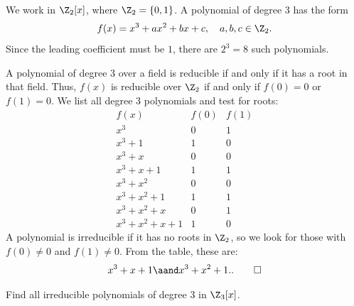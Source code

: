 \begin{solution}
  We work in $\Z_2[x]$, where $\Z_2 = \{0,1\}$. A polynomial of degree $3$ has the form
  \[%
    f(x) = x^3 + ax^2 + bx + c, \quad a,b,c \in \Z_2
  .\]%
  Since the leading coefficient must be $1$, there are $2^3 = 8$ such polynomials.

  A polynomial of degree $3$ over a field is reducible if and only if it has a root in that field. Thus, $f(x)$ is reducible over $\Z_2$ if and only if $f(0) = 0$ or $f(1) = 0$. We list all degree $3$ polynomials and test for roots:
  \[%
    \begin{array}{c|c|c}
      f(x) & f(0) & f(1) \\ \hline
      x^3 & 0 & 1 \\
      x^3+1 & 1 & 0 \\
      x^3+x & 0 & 0 \\
      x^3+x+1 & 1 & 1 \\
      x^3+x^2 & 0 & 0 \\
      x^3+x^2+1 & 1 & 1 \\
      x^3+x^2+x & 0 & 1 \\
      x^3+x^2+x+1 & 1 & 0
    \end{array}
  \]
  A polynomial is irreducible if it has no roots in $\Z_2$, so we look for those with $f(0) \neq 0$ and $f(1) \neq 0$. From the table, these are:
  \[%
    x^3 + x + 1 \aand x^3 + x^2 + 1.
  .\qedhere\]%
\end{solution}

\begin{problem}[28.39]
  Find all irreducible polynomials of degree 3 in $\Z_3[x]$.
\end{problem}

